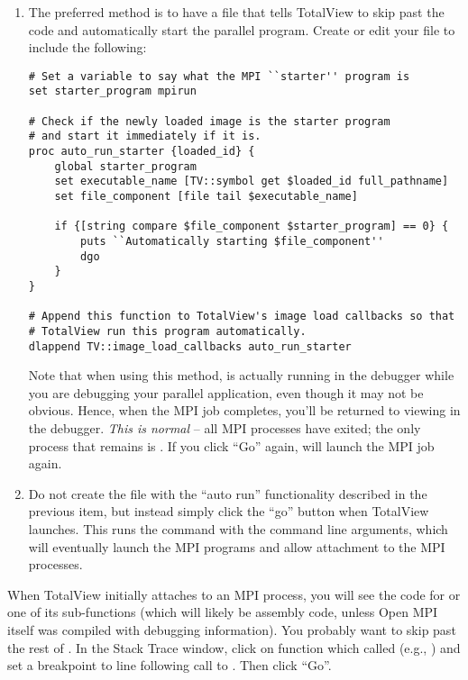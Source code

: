 \begin{enumerate}
\item The preferred method is to have a  file
  that tells TotalView to skip past the  code and
  automatically start the parallel program.  Create or edit your
   file to include the following:

\lstset{style=lam-shell}
\begin{lstlisting}
# Set a variable to say what the MPI ``starter'' program is
set starter_program mpirun

# Check if the newly loaded image is the starter program
# and start it immediately if it is.
proc auto_run_starter {loaded_id} {
    global starter_program
    set executable_name [TV::symbol get $loaded_id full_pathname]
    set file_component [file tail $executable_name]
                               
    if {[string compare $file_component $starter_program] == 0} {
        puts ``Automatically starting $file_component''
        dgo
    }
}

# Append this function to TotalView's image load callbacks so that
# TotalView run this program automatically.
dlappend TV::image_load_callbacks auto_run_starter
\end{lstlisting}

Note that when using this method,  is actually running in
the debugger while you are debugging your parallel application, even
though it may not be obvious.  Hence, when the MPI job completes,
you'll be returned to viewing  in the debugger.  {\em This
  is normal} -- all MPI processes have exited; the only process that
remains is .  If you click ``Go'' again,  will
launch the MPI job again.

\item Do not create the  file with the ``auto
  run'' functionality described in the previous item, but instead
  simply click the ``go'' button when TotalView launches.  This runs
  the  command with the command line arguments, which will
  eventually launch the MPI programs and allow attachment to the MPI
  processes.
  
\end{enumerate}

When TotalView initially attaches to an MPI process, you will see the
code for  or one of its sub-functions (which will
likely be assembly code, unless Open MPI itself was compiled with debugging
information).
%
You probably want to skip past the rest of .  In
the Stack Trace window, click on function which called
 (e.g., ) and set a breakpoint to line
following call to .  Then click ``Go''.

